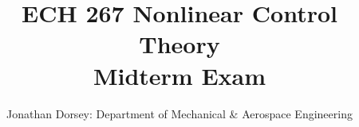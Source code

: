 \documentclass[12px]{article}
\begin{document}
    \title{ECH 267 Nonlinear Control Theory \\ Midterm Exam  }

    \author{Jonathan Dorsey: Department of Mechanical \& Aerospace Engineering}


    \maketitle











\end{document}
